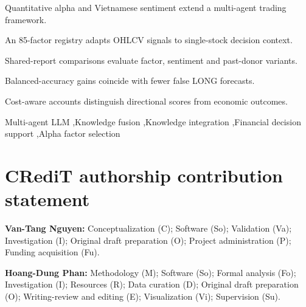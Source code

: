 \documentclass[preprint,12pt]{elsarticle}
\begin{document}
\begin{frontmatter}


\begin{highlights}
\item Quantitative alpha and Vietnamese sentiment extend a multi-agent trading framework.
\item An 85-factor registry adapts OHLCV signals to single-stock decision context.
\item Shared-report comparisons evaluate factor, sentiment and past-donor variants.
\item Balanced-accuracy gains coincide with fewer false LONG forecasts.
\item Cost-aware accounts distinguish directional scores from economic outcomes.
\end{highlights}

\begin{keyword}
Multi-agent LLM \sep Knowledge fusion \sep Knowledge integration \sep Financial decision support \sep Alpha factor selection
\end{keyword}

\end{frontmatter}










\section*{CRediT authorship contribution statement}

\textbf{Van-Tang Nguyen:} Conceptualization (C); Software (So); Validation (Va); Investigation (I); Original draft preparation (O); Project administration (P); Funding acquisition (Fu).

\textbf{Hoang-Dung Phan:} Methodology (M); Software (So); Formal analysis (Fo); Investigation (I); Resources (R); Data curation (D); Original draft preparation (O); Writing-review and editing (E); Visualization (Vi); Supervision (Su).
\end{document}

